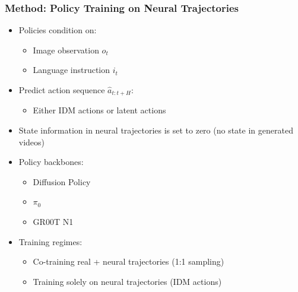 \documentclass{beamer}
\begin{document}
\begin{frame}
  \frametitle{Method: Policy Training on Neural Trajectories}
  \small
  \begin{itemize}
    \item Policies condition on:
      \begin{itemize}
        \item Image observation $o_t$
        \item Language instruction $i_t$
      \end{itemize}
    \item Predict action sequence $\hat{a}_{t:t+H}$:
      \begin{itemize}
        \item Either IDM actions or latent actions
      \end{itemize}
    \item State information in neural trajectories is set to zero (no state in generated videos)
    \item Policy backbones:
      \begin{itemize}
        \item Diffusion Policy
        \item $\pi_0$
        \item GR00T N1
      \end{itemize}
    \item Training regimes:
      \begin{itemize}
        \item Co-training real + neural trajectories (1:1 sampling)
        \item Training solely on neural trajectories (IDM actions)
      \end{itemize}
  \end{itemize}
\end{frame}
\end{document}

